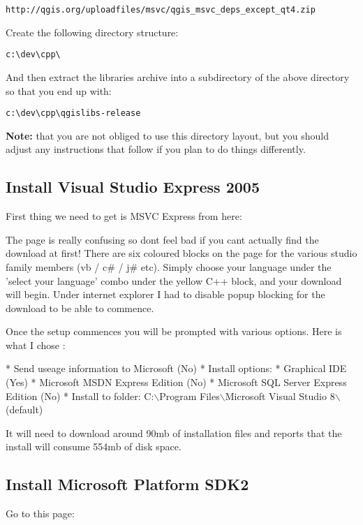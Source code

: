 \begin{verbatim}
http://qgis.org/uploadfiles/msvc/qgis_msvc_deps_except_qt4.zip
\end{verbatim}

Create the following directory structure:

\begin{verbatim}
c:\dev\cpp\
\end{verbatim}

And then extract the libraries archive into a subdirectory of the above
directory so that you end up with:

\begin{verbatim}
c:\dev\cpp\qgislibs-release
\end{verbatim}

\textbf{Note:} that you are not obliged to use this directory layout, but you 
should adjust any instructions that follow if you plan to do things 
differently.

\subsection{Install Visual Studio Express 2005}
First thing we need to get is MSVC Express from here:


The page is really confusing so dont feel bad if you cant actually find the 
download at first! There are six coloured blocks on the page for the various  
studio family members (vb / c\# / j\# etc). Simply choose your language under 
the 'select your language' combo under the yellow C++ block, and your download 
will begin. Under internet explorer I had to disable popup blocking for the 
download to be able to commence.

Once the setup commences you will be prompted with various options. Here is what 
I chose :

 * Send useage information to Microsoft   (No)
 * Install options:
   * Graphical IDE                        (Yes)
   * Microsoft MSDN Express Edition       (No)
   * Microsoft SQL Server Express Edition (No)
 * Install to folder: C:$\backslash$Program Files$\backslash$Microsoft Visual Studio 8$\backslash$   (default)

It will need to download around 90mb of installation files and reports 
that the install will consume 554mb of disk space.

\subsection{Install Microsoft Platform SDK2}
Go to this page:

